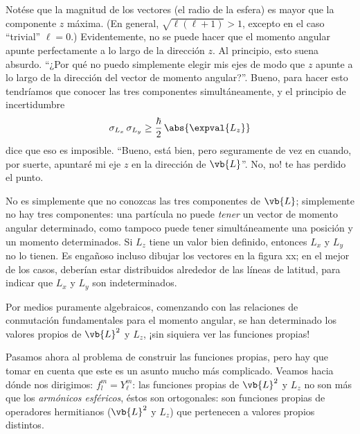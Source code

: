 Notése que la magnitud de los vectores (el radio de la esfera) es mayor que la componente $z$ máxima. (En general, $\sqrt{\ell (\ell + 1)} > 1$, excepto en el caso \enquote{trivial} $\ell = 0$.) Evidentemente, no se puede hacer que el momento angular apunte perfectamente a lo largo de la dirección $z$. Al principio, esto suena absurdo. \enquote{¿Por qué no puedo simplemente elegir mis ejes de modo que $z$ apunte a lo largo de la dirección del vector de momento angular?}. Bueno, para hacer esto tendríamos que conocer las tres componentes simultáneamente, y el principio de incertidumbre 
\begin{align}
\sigma_{L_{x}} \, \sigma_{L_{y}} \geq \dfrac{\hbar}{2} \, \abs{ \expval{L_{z}}}
\label{eq:ecuacion_04_100}
\end{align}
dice que eso es imposible. \enquote{Bueno, está bien, pero seguramente de vez en cuando, por suerte, apuntaré mi eje $z$ en la dirección de $\vb{L}$}. No, no! te has perdido el punto.
\par
No es simplemente que no conozcas las tres componentes de $\vb{L}$; simplemente no hay tres componentes: una partícula no puede \emph{tener} un vector de momento angular determinado, como tampoco puede tener simultáneamente una posición y un momento determinados. Si $L_{z}$ tiene un valor bien definido, entonces $L_{x}$ y $L_{y}$ no lo tienen. Es engañoso incluso dibujar los vectores en la figura xx; en el mejor de los casos, deberían estar distribuidos alrededor de las líneas de latitud, para indicar que $L_{x}$ y $L_{y}$ son indeterminados.
\par
Por medios puramente algebraicos, comenzando con las relaciones de conmutación fundamentales para el momento angular, se han determinado los valores propios de $\vb{L}^{2}$ y $L_{z}$, ¡sin siquiera ver las funciones propias!
\par
Pasamos ahora al problema de construir las funciones propias, pero hay que tomar en cuenta que este es un asunto mucho más complicado. Veamos hacia dónde nos dirigimos: $f_{l}^{m} = Y_{\ell}^{m}$: las funciones propias de $\vb{L}^{2}$ y $L_{z}$ no son más que los \emph{armónicos esféricos}, éstos son ortogonales: son funciones propias de operadores hermitianos ($\vb{L}^{2}$ y $L_{z}$) que pertenecen a valores propios distintos.

